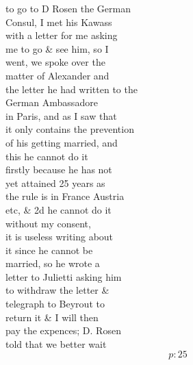 \documentclass{report}
\begin{document}
	\par{
 	to go to D Rosen the German\ \\Consul, I met his Kawass\ \\with a letter for me asking\ \\me to go \& see him, so I\ \\went, we spoke over the\ \\matter of Alexander and\ \\the letter he had written to the\ \\German Ambassadore\ \\in Paris, and as I saw that\ \\it only contains the prevention\ \\of his getting married, and\ \\this he cannot do it\ \\firstly because he has not\ \\yet attained 25 years as\ \\the rule is in France Austria\ \\etc, \& 2d he cannot do it\ \\without my consent,\ \\it is useless writing about\ \\it since he cannot be\ \\married, so he wrote a\ \\letter to Julietti asking him\ \\to withdraw the letter \&\ \\telegraph to Beyrout to\ \\return it \& I will then\ \\pay the expences; D. Rosen\ \\told that we better wait\ \\
  \[p: 25 \]

	}


\end{document}
